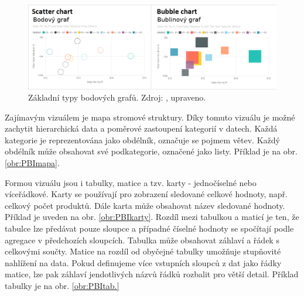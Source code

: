 \begin{figure}[h!]
    \centering
    \captionsetup{justification=centering}
    \includegraphics[width=.9\textwidth]{obrazky/PBIteorie/power-bi-compare-charts.png}
    \caption{Základní typy bodových grafů. 
    Zdroj: \cite{bib:PBI}, upraveno.}
    \label{obr:PBI:grafybod}
\end{figure}

Zajímavým vizuálem je mapa stromové struktury. Díky tomuto vizuálu je možné zachytit hierarchická data a poměrové zastoupení kategorií v datech. Každá kategorie je reprezentována jako obdélník, označuje se pojmem větev. Každý obdélník může obsahovat své podkategorie, označené jako listy. Příklad je na obr. \ref*{obr:PBImapa}.

Formou vizuálu jsou i tabulky, matice a tzv. karty - jednočíselné nebo víceřádkové. Karty se používají pro zobrazení sledované celkové hodnoty, např. celkový počet produktů. Dále karta může obsahovat název sledované hodnoty. Příklad je uveden na obr. \ref*{obr:PBIkarty}. 
Rozdíl mezi tabulkou a maticí je ten, že tabulce lze předávat pouze sloupce a případné číselné hodnoty se spočítají podle agregace v předchozích sloupcích. Tabulka může obsahovat záhlaví a řádek s celkovými součty. Matice na rozdíl od obyčejné tabulky umožňuje stupňovité nahlížení na data. Pokud definujeme více vstupních sloupců z dat jako řádky matice, lze pak záhlaví jendotlivých názvů řádků rozbalit pro větší detail. Příklad tabulky je na obr.         \ref*{obr:PBItab.}

